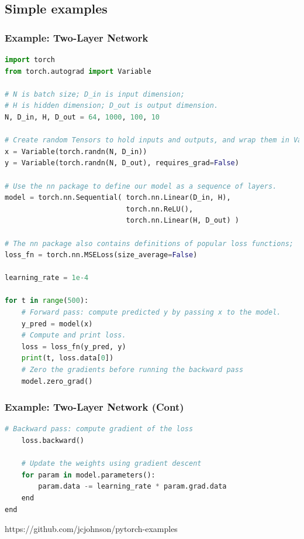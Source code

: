 \subsection{Simple examples}

\begin{frame}[fragile]
\MyLogo
\frametitle{Example: Two-Layer Network}  
\scriptsize{
\begin{lstlisting}[language=python]
import torch
from torch.autograd import Variable

# N is batch size; D_in is input dimension;
# H is hidden dimension; D_out is output dimension.
N, D_in, H, D_out = 64, 1000, 100, 10

# Create random Tensors to hold inputs and outputs, and wrap them in Variables.
x = Variable(torch.randn(N, D_in))
y = Variable(torch.randn(N, D_out), requires_grad=False)

# Use the nn package to define our model as a sequence of layers.
model = torch.nn.Sequential( torch.nn.Linear(D_in, H),
                             torch.nn.ReLU(),
                             torch.nn.Linear(H, D_out) )

# The nn package also contains definitions of popular loss functions;
loss_fn = torch.nn.MSELoss(size_average=False)

learning_rate = 1e-4

for t in range(500):
	# Forward pass: compute predicted y by passing x to the model.
	y_pred = model(x)
	# Compute and print loss.
	loss = loss_fn(y_pred, y)
	print(t, loss.data[0])
	# Zero the gradients before running the backward pass
	model.zero_grad()
\end{lstlisting}
}
\end{frame}

\begin{frame}[fragile]
\MyLogo
\frametitle{Example: Two-Layer Network (Cont)}  

\ContinueLineNumber
\begin{lstlisting}[language=python]         
	# Backward pass: compute gradient of the loss
	loss.backward()
         
	# Update the weights using gradient descent
	for param in model.parameters():
		param.data -= learning_rate * param.grad.data
	end
end
\end{lstlisting}

\vskip 125pt

\begin{center}
{\color{red}\scriptsize
https://github.com/jcjohnson/pytorch-examples
}
\end{center}

\end{frame}

